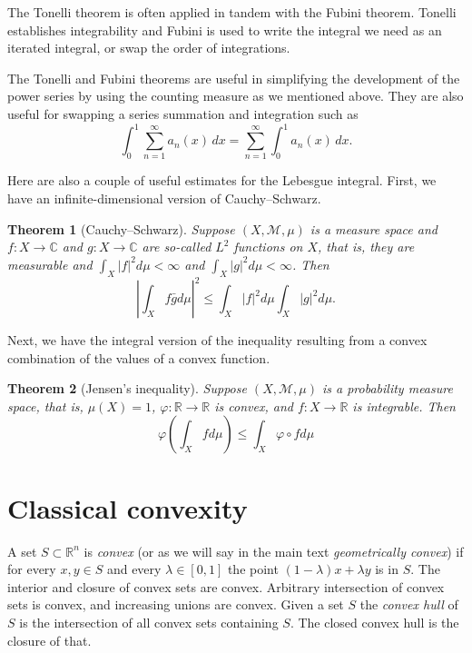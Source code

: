 \documentclass[12pt,openany]{book}
\newcommand{\sabs}[1]{\lvert {#1} \rvert}
\newcommand{\abs}[1]{\left\lvert {#1} \right\rvert}
\newcommand{\C}{{\mathbb{C}}}
\newcommand{\R}{{\mathbb{R}}}
\newcommand{\sM}{{\mathscr{M}}}
\newcommand{\myindex}[1]{#1\index{#1}}
\theoremstyle{plain}
\newtheorem{thm}{Theorem}[section]
\theoremstyle{remark}
\theoremstyle{definition}
\theoremstyle{exercise}
\theoremstyle{example}
\begin{document}
The Tonelli theorem is often applied in tandem with the Fubini theorem.  Tonelli
establishes integrability and Fubini is used to write the integral we need
as an iterated integral, or swap the order of integrations.

The Tonelli and Fubini theorems are useful in simplifying the
development of the power series by using the counting measure as we
mentioned above.  They are also useful for swapping a series summation and
integration such as
\begin{equation*}
\int_0^1 \sum_{n=1}^\infty a_n(x) \, dx
=
\sum_{n=1}^\infty \int_0^1 a_n(x) \, dx .
\end{equation*}

\pagebreak[2]
Here are also a couple of useful estimates for the Lebesgue integral.
First, we have an infinite-dimensional version of Cauchy--Schwarz.

\begin{thm}[Cauchy--Schwarz]
Suppose $(X,\sM,\mu)$ is a measure space and $f \colon X \to \C$ and
$g \colon X \to \C$
are so-called $L^2$ functions on $X$, that is,
they are measurable and
$\int_X \sabs{f}^2 d\mu < \infty$ and
$\int_X \sabs{g}^2 d\mu < \infty$.  Then
\begin{equation*}
\abs{
\int_X f \bar{g} d\mu
}^2
\leq
\int_X \sabs{f}^2 d\mu
\int_X \sabs{g}^2 d\mu .
\end{equation*}
\end{thm}

Next, we have the integral version of the inequality
resulting from a convex combination of the values of a convex function.

\begin{thm}[Jensen's inequality]
Suppose $(X,\sM,\mu)$ is a probability measure space, that is, $\mu(X)=1$,
$\varphi \colon \R \to \R$ is convex, and $f \colon X \to \R$ is integrable.  Then
\begin{equation*}
\varphi \left(
\int_X f d\mu
\right)
\leq
\int_X \varphi \circ f d\mu
\end{equation*}
\end{thm}


\section{Classical convexity} \label{apsec:convexity}

A set $S \subset \R^n$ is \emph{convex}
(or as we will say in the main text
\emph{\myindex{geometrically convex}})
if for every $x,y \in S$ and every $\lambda \in [0,1]$ the
point $(1-\lambda) x + \lambda y$ is in $S$.
The interior and closure of convex sets are convex.
Arbitrary intersection of convex sets is convex, and increasing unions
are convex.  Given a set $S$ the \emph{\myindex{convex hull}} of $S$ is
the intersection of all convex sets containing $S$.  The closed convex hull
is the closure of that.
\end{document}
